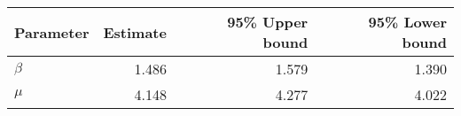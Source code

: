 \begin{tabular}{lrrr}
\toprule
Parameter &  Estimate &  95\% Upper bound &  95\% Lower bound \\
\midrule
  $\beta$ &     1.486 &             1.579 &             1.390 \\
    $\mu$ &     4.148 &             4.277 &             4.022 \\
\bottomrule
\end{tabular}
